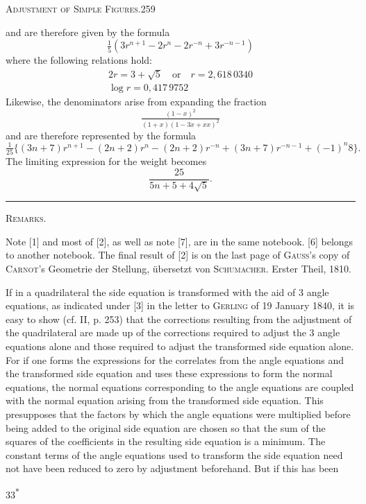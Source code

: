 \clearpage
\noindent\mbox{}\hfill\textsc{Adjustment of Simple Figures.}\hfill259\par\medskip
\noindent and are therefore given by the formula
\[
\tfrac15(3r^{n+1}-2r^n-2r^{-n}+3r^{-n-1})
\]
\noindent where the following relations hold:
\[
\begin{gathered}
2r=3+\sqrt5\quad\text{or}\quad r=2{,}618\,0340\\
\log r=0{,}417\,9752
\end{gathered}
\]
\noindent Likewise, the denominators arise from expanding the fraction
\[
\tfrac{(1-x)^2}{(1+x)(1-3x+xx)^2}
\]
\noindent and are therefore represented by the formula
\[
\tfrac1{25}\{(3n+7)r^{n+1}-(2n+2)r^n-(2n+2)r^{-n}+(3n+7)r^{-n-1}+(-1)^n8\}.
\]
The limiting expression for the weight becomes
\[
\frac{25}{5n+5+4\sqrt5}.
\]
\begin{center}\rule{3cm}{.4pt}\end{center}
\bigskip
\begin{center}\textsc{Remarks.}\end{center}
\begingroup\footnotesize
Note [1] and most of [2], as well as note [7], are in the same notebook. [6] belongs to another notebook. The final result of [2] is on the last page of \textsc{Gauss}'s copy of \textsc{Carnot}'s Geometrie der Stellung, übersetzt von \textsc{Schumacher}. Erster Theil, 1810.

If in a quadrilateral the side equation is transformed with the aid of 3 angle equations, as indicated under [3] in the letter to \textsc{Gerling} of 19 January 1840, it is easy to show (cf. II, p. 253) that the corrections resulting from the adjustment of the quadrilateral are made up of the corrections required to adjust the 3 angle equations alone and those required to adjust the transformed side equation alone. For if one forms the expressions for the correlates from the angle equations and the transformed side equation and uses these expressions to form the normal equations, the normal equations corresponding to the angle equations are  coupled with the normal equation arising from the transformed side equation. This presupposes that the factors by which the angle equations were multiplied before being added to the original side equation are chosen so that the sum of the squares of the coefficients in the resulting side equation is a minimum. The constant terms of the angle equations used to transform the side equation need not have been reduced to zero by adjustment beforehand. But if this has been
\par\endgroup
\vfill\noindent\hfill33\textsuperscript{$\ast$}\hspace*{2cm}

